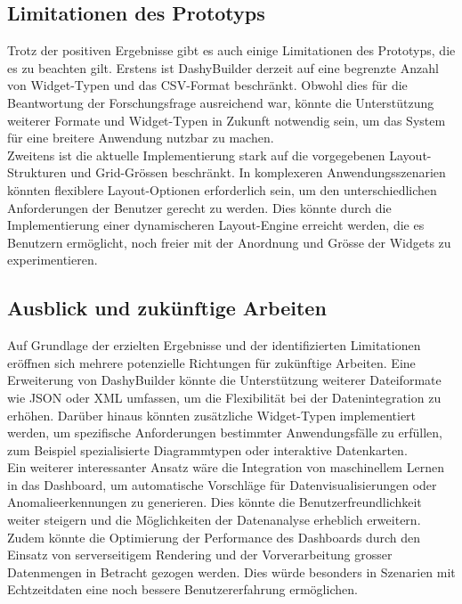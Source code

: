 \documentclass[a4paper, 12pt]{scrartcl}
\begin{document}
\subsection{Limitationen des Prototyps}
Trotz der positiven Ergebnisse gibt es auch einige Limitationen des Prototyps, die es zu beachten gilt. Erstens ist DashyBuilder derzeit auf eine begrenzte Anzahl von Widget-Typen und das \ac{CSV}-Format beschränkt. Obwohl dies für die Beantwortung der Forschungsfrage ausreichend war, könnte die Unterstützung weiterer Formate und Widget-Typen in Zukunft notwendig sein, um das System für eine breitere Anwendung nutzbar zu machen.\\[1em]Zweitens ist die aktuelle Implementierung stark auf die vorgegebenen Layout-Strukturen und Grid-Grössen beschränkt. In komplexeren Anwendungsszenarien könnten flexiblere Layout-Optionen erforderlich sein, um den unterschiedlichen Anforderungen der Benutzer gerecht zu werden. Dies könnte durch die Implementierung einer dynamischeren Layout-Engine erreicht werden, die es Benutzern ermöglicht, noch freier mit der Anordnung und Grösse der Widgets zu experimentieren.

\subsection{Ausblick und zukünftige Arbeiten}
Auf Grundlage der erzielten Ergebnisse und der identifizierten Limitationen eröffnen sich mehrere potenzielle Richtungen für zukünftige Arbeiten. Eine Erweiterung von DashyBuilder könnte die Unterstützung weiterer Dateiformate wie JSON oder XML umfassen, um die Flexibilität bei der Datenintegration zu erhöhen. Darüber hinaus könnten zusätzliche Widget-Typen implementiert werden, um spezifische Anforderungen bestimmter Anwendungsfälle zu erfüllen, zum Beispiel spezialisierte Diagrammtypen oder interaktive Datenkarten.\\[1em]Ein weiterer interessanter Ansatz wäre die Integration von maschinellem Lernen in das Dashboard, um automatische Vorschläge für Datenvisualisierungen oder Anomalieerkennungen zu generieren. Dies könnte die Benutzerfreundlichkeit weiter steigern und die Möglichkeiten der Datenanalyse erheblich erweitern.\\[1em]Zudem könnte die Optimierung der Performance des Dashboards durch den Einsatz von serverseitigem Rendering und der Vorverarbeitung grosser Datenmengen in Betracht gezogen werden. Dies würde besonders in Szenarien mit Echtzeitdaten eine noch bessere Benutzererfahrung ermöglichen.
\end{document}
